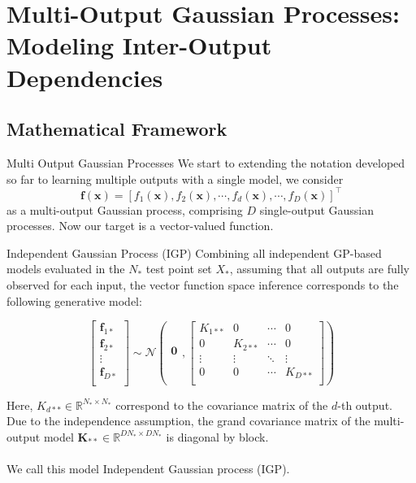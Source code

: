\section{Multi-Output Gaussian Processes: Modeling Inter-Output Dependencies}

\subsection{Mathematical Framework}
\begin{frame}{Multi Output Gaussian Processes}
	We start to extending the notation developed so far to learning multiple outputs with a single model, we consider
	\begin{equation*}
		\boldsymbol{f}(\mathbf{x}) = \left[f_1(\mathbf{x}), f_2(\mathbf{x}), \cdots, f_d(\mathbf{x}), \cdots, f_D(\mathbf{x})\right]^\top
	\end{equation*}
	as a multi-output Gaussian process, comprising $D$ single-output Gaussian processes. Now our target is a vector-valued function.
\end{frame}

\begin{frame}{Independent Gaussian Process (IGP)}
	Combining all independent GP-based models evaluated in the $N_*$ test point set $X_*$, assuming that all outputs are fully observed for each input, the vector function space inference corresponds to the following generative model:
	
	
	\begin{equation*}\label{eq:igp}
		\left[ \begin{array}{c}
			\mathbf{f}_{1*}\\
			\mathbf{f}_{2*}\\
			\vdots\\
			\mathbf{f}_{D*}\\
		\end{array}
		\right]
		\sim
		\mathcal{N} \left(
		\begin{array}{c}
			\mathbf{0}\\
		\end{array},
		\left[ \begin{array}{cccccc}
			K_{1**} & 0 & \cdots & 0 \\
			0 & K_{2**} & \cdots & 0 \\
			\vdots & \vdots & \ddots & \vdots\\
			0 & 0 & \cdots & K_{D**}\\
		\end{array}
		\right] \right)
	\end{equation*}
	
	Here, $K_{d**} \in \mathbb{R}^{N_* \times N_*}$ correspond to the covariance matrix of the $d$-th output. Due to the independence assumption, the grand covariance matrix of the multi-output model $\mathbf{K}_{**} \in \mathbb{R}^{DN_* \times DN_*}$ is diagonal by block.\\~\\
	
	We call this model Independent Gaussian process (IGP).
\end{frame}

